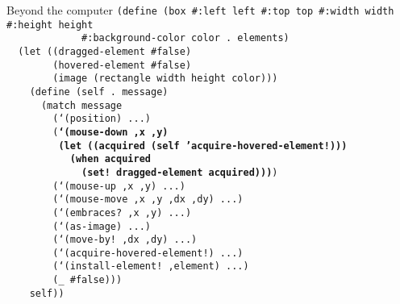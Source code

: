 \begin{frame}{Beyond the computer}
  \tiny
  \texttt{(define (box \#:left left \#:top top \#:width width \#:height height\\
    \ \ \ \ \ \ \ \ \ \ \ \ \ \#:background-color color .\ elements)\\
    \ \ (let ((dragged-element \#false)\\
    \ \ \ \ \ \ \ \ (hovered-element \#false)\\
    \ \ \ \ \ \ \ \ (image (rectangle width height color)))\\
    \ \ \ \ (define (self .\ message)\\
    \ \ \ \ \ \ (match message\\
    \ \ \ \ \ \ \ \ (`(position) ...)\\
    \ \ \ \ \ \ \ \ (\textbf{`(mouse-down ,x ,y)\\
    \ \ \ \ \ \ \ \ \ (let ((acquired (self 'acquire-hovered-element!)))\\
    \ \ \ \ \ \ \ \ \ \ \ (when acquired\\
    \ \ \ \ \ \ \ \ \ \ \ \ \ (set!\ dragged-element acquired)))})\\
    \ \ \ \ \ \ \ \ (`(mouse-up ,x ,y) ...)\\
    \ \ \ \ \ \ \ \ (`(mouse-move ,x ,y ,dx ,dy) ...)\\
    \ \ \ \ \ \ \ \ (`(embraces?\ ,x ,y) ...)\\
    \ \ \ \ \ \ \ \ (`(as-image) ...)\\
    \ \ \ \ \ \ \ \ (`(move-by!\ ,dx ,dy) ...)\\
    \ \ \ \ \ \ \ \ (`(acquire-hovered-element!) ...)\\
    \ \ \ \ \ \ \ \ (`(install-element!\ ,element) ...)\\
    \ \ \ \ \ \ \ \ (\_ \#false)))\\
    \ \ \ \ self))} \\
  \ \\ \ \\ \ \\ \ \\ \ \\ \ \\ \ \\ \ 
\end{frame}

